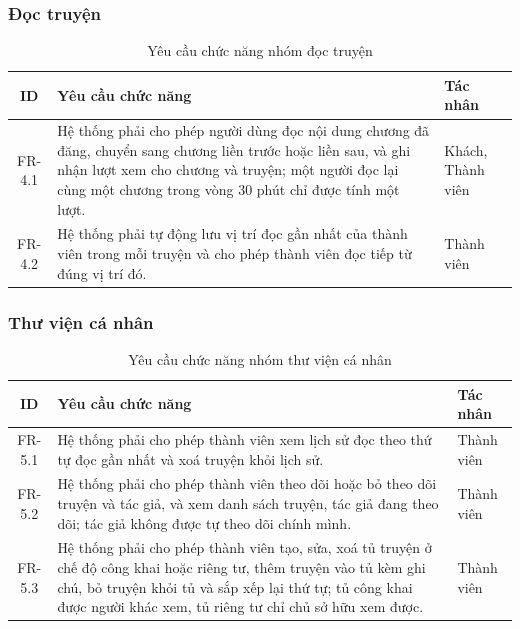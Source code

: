 \subsubsection{Đọc truyện}

\begin{table}[H]
\centering
\renewcommand{\arraystretch}{1.3}
\begin{tabularx}{\textwidth}{|c|X|p{3cm}|}
\hline
\textbf{ID} & \textbf{Yêu cầu chức năng} & \textbf{Tác nhân} \\ \hline
FR-4.1 & Hệ thống phải cho phép người dùng đọc nội dung chương đã đăng, chuyển sang chương liền trước hoặc liền sau, và ghi nhận lượt xem cho chương và truyện; một người đọc lại cùng một chương trong vòng 30 phút chỉ được tính một lượt. & Khách, Thành viên \\ \hline
FR-4.2 & Hệ thống phải tự động lưu vị trí đọc gần nhất của thành viên trong mỗi truyện và cho phép thành viên đọc tiếp từ đúng vị trí đó. & Thành viên \\ \hline
\end{tabularx}
\caption{Yêu cầu chức năng nhóm đọc truyện}
\label{tab:fr-reading}
\end{table}

\subsubsection{Thư viện cá nhân}

\begin{table}[H]
\centering
\renewcommand{\arraystretch}{1.3}
\begin{tabularx}{\textwidth}{|c|X|p{3cm}|}
\hline
\textbf{ID} & \textbf{Yêu cầu chức năng} & \textbf{Tác nhân} \\ \hline
FR-5.1 & Hệ thống phải cho phép thành viên xem lịch sử đọc theo thứ tự đọc gần nhất và xoá truyện khỏi lịch sử. & Thành viên \\ \hline
FR-5.2 & Hệ thống phải cho phép thành viên theo dõi hoặc bỏ theo dõi truyện và tác giả, và xem danh sách truyện, tác giả đang theo dõi; tác giả không được tự theo dõi chính mình. & Thành viên \\ \hline
FR-5.3 & Hệ thống phải cho phép thành viên tạo, sửa, xoá tủ truyện ở chế độ công khai hoặc riêng tư, thêm truyện vào tủ kèm ghi chú, bỏ truyện khỏi tủ và sắp xếp lại thứ tự; tủ công khai được người khác xem, tủ riêng tư chỉ chủ sở hữu xem được. & Thành viên \\ \hline
\end{tabularx}
\caption{Yêu cầu chức năng nhóm thư viện cá nhân}
\label{tab:fr-library}
\end{table}

